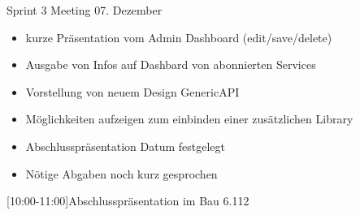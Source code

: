 \begin{Protokoll}{Sprint 3 Meeting 07. Dezember}
\fehlendEntschuldigt{}
\protokollKopf

\begin{itemize}
  \item kurze Präsentation vom Admin Dashboard (edit/save/delete)
  \item Ausgabe von Infos auf Dashbard von abonnierten Services
\end{itemize}

\begin{itemize}
  \item Vorstellung von neuem Design GenericAPI
  \item Möglichkeiten aufzeigen zum einbinden einer zusätzlichen Library
\end{itemize}

\begin{itemize}
  \item Abschlusspräsentation Datum festgelegt
  \item Nötige Abgaben noch kurz gesprochen
\end{itemize}


[10:00-11:00]{Abschlusspräsentation im Bau 6.112}


\end{Protokoll}

